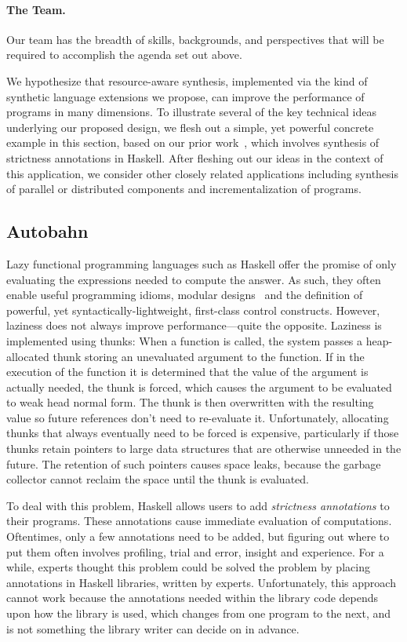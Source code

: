 \paragraph{The Team.}  Our team has the breadth of skills, backgrounds, and perspectives that will be required to accomplish the agenda set out above.  


We hypothesize that resource-aware synthesis, implemented via the kind
of synthetic language extensions we propose, can improve the
performance of programs in many dimensions.  To illustrate several of
the key technical ideas underlying our proposed design, we flesh out a
simple, yet powerful concrete example in this section, based on our
prior work~\cite{autobahn}, which involves synthesis of strictness
annotations in Haskell.  After fleshing out our ideas in the context
of this application, we consider other closely related applications
including synthesis of parallel or distributed components and
incrementalization of programs.

\subsection{Autobahn}

Lazy functional programming languages such as
Haskell offer the promise of only evaluating the expressions needed
to compute the answer. As such, they often enable useful programming
idioms, modular designs~\cite{?} and the definition of powerful,
yet syntactically-lightweight, first-class control constructs. 
However, laziness does not always improve performance---quite the
opposite.  Laziness is implemented using thunks: When a function is called, the
system passes a heap-allocated thunk storing an unevaluated argument to
the function. If in the execution of the function it is determined that
the value of the argument is actually needed, the thunk is forced,
which causes the argument to be evaluated to weak head normal
form. The thunk is then overwritten with the resulting value so future
references don’t need to re-evaluate it.  Unfortunately,
allocating thunks that always eventually need to be forced is expensive,
particularly if those thunks retain pointers to large data structures
that are otherwise unneeded in the future.  The retention of such
pointers causes space leaks, because the garbage collector cannot
reclaim the space until the thunk is evaluated.

To deal with this problem, Haskell allows users to add
\emph{strictness annotations} to their programs.  These annotations
cause immediate evaluation of computations. Oftentimes, only a few
annotations need to be added, but figuring out where to put them often
involves profiling, trial and error, insight and experience.  For a
while, experts thought this problem could be solved the problem by
placing annotations in Haskell libraries, written by
experts. Unfortunately, this approach cannot work because the
annotations needed within the library code depends upon how the
library is used, which changes from one program to the next, and is
not something the library writer can decide on in advance.

